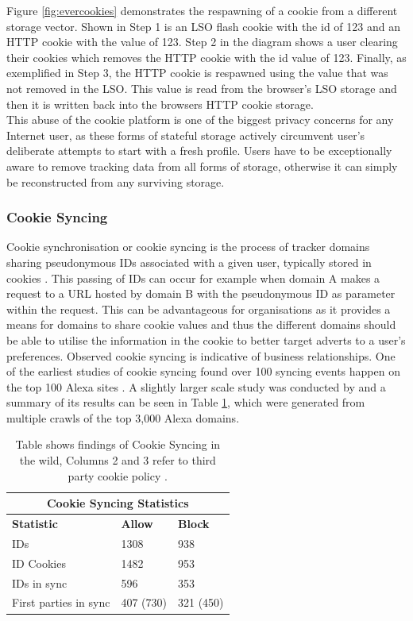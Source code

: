 \documentclass[12pt]{article}
\begin{document}
Figure \ref{fig:evercookies} demonstrates the respawning of a cookie from a different storage vector. Shown in Step 1 is an LSO flash cookie with the id of 123 and an HTTP cookie with the value of 123. Step 2 in the diagram shows a user clearing their cookies which removes the HTTP cookie with the id value of 123. Finally, as exemplified in Step 3, the HTTP cookie is respawned using the value that was not removed in the LSO. This value is read from the browser's LSO storage and then it is written back into the browsers HTTP cookie storage. \\

This abuse of the cookie platform is one of the biggest privacy concerns for any Internet user, as these forms of stateful storage actively circumvent user's deliberate attempts to start with a fresh profile. Users have to be exceptionally aware to remove tracking data from all forms of storage, otherwise it can simply be reconstructed from any surviving storage. 

\subsubsection{Cookie Syncing}
Cookie synchronisation or cookie syncing is the process of tracker domains sharing pseudonymous IDs associated with a given user, typically stored in cookies \parencite{webNeverForgets}. This passing of IDs can occur for example when domain A makes a request to a URL hosted by domain B with the pseudonymous ID as parameter within the request. This can be advantageous for organisations as it provides a means for domains to share cookie values and thus the different domains should be able to utilise the information in the cookie to better target adverts to a user's preferences. Observed cookie syncing is indicative of business relationships.  One of the earliest studies of cookie syncing found over 100 syncing events happen on the top 100 Alexa sites \parencite{sellingPrivacy}. A slightly larger scale study was conducted by \parencite{webNeverForgets} and a summary of its results can be seen in Table \ref{table:1}, which were generated from multiple crawls of the top 3,000 Alexa domains. \\

{
\begin{table} [H]
\centering
\begin{tabular}{ |p{4cm}|p{4cm}|p{4cm}|  }
\hline
\multicolumn{3}{|c|}{\textbf{Cookie Syncing Statistics}} \\
\hline
\textbf{Statistic} & \textbf{Allow} & \textbf{Block} \\
\hline
IDs & 1308 & 938 \\
\hline
ID Cookies & 1482   & 953 \\
\hline
IDs in sync & 596 & 353 \\
\hline
First parties in sync & 407 (730) & 321 (450) \\
\hline
\end{tabular}
\caption{Table shows findings of Cookie Syncing in the wild, Columns 2 and 3 refer to third party cookie policy \parencite{webNeverForgets}.}
\label{table:1}
\end{table}
}
\end{document}
